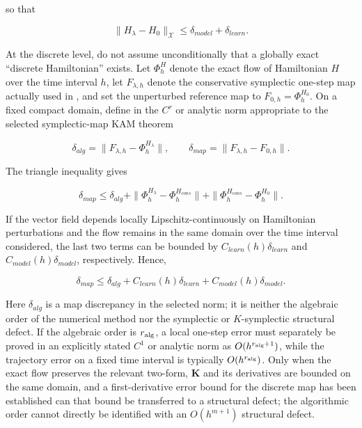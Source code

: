 so that

\begin{equation}
\label{eq:hamiltonian-3-90}
\boxed{\parallel H_{\lambda} - H_{0} \parallel_{\mathcal{X}} \leq \delta_{model} + \delta_{learn}.}
\end{equation}

At the discrete level, do not assume unconditionally that a globally exact ``discrete Hamiltonian'' exists. Let \(\Phi_{h}^{H}\) denote the exact flow of Hamiltonian \(H\) over the time interval \(h\), let \(F_{\lambda,h}\) denote the conservative symplectic one-step map actually used in , and set the unperturbed reference map to \(F_{0,h}=\Phi_{h}^{H_{0}}\). On a fixed compact domain, define in the \(C^{r}\) or analytic norm appropriate to the selected symplectic-map KAM theorem\cite{HairerLubichWanner2006GNI,FengQin2010}

\begin{equation}
\label{eq:hamiltonian-3-91}
\delta_{alg} = \parallel F_{\lambda,h} - \Phi_{h}^{H_{\lambda}} \parallel ,\quad\quad\delta_{map} = \parallel F_{\lambda,h} - F_{0,h} \parallel .
\end{equation}

The triangle inequality gives

\begin{equation}
\label{eq:hamiltonian-3-92}
\boxed{\delta_{map} \leq \delta_{alg} + \parallel \Phi_{h}^{H_{\lambda}} - \Phi_{h}^{H_{cons}} \parallel + \parallel \Phi_{h}^{H_{cons}} - \Phi_{h}^{H_{0}} \parallel .}
\end{equation}

If the vector field depends locally Lipschitz-continuously on Hamiltonian perturbations and the flow remains in the same domain over the time interval considered, the last two terms can be bounded by \(C_{learn}(h)\delta_{learn}\) and \(C_{model}(h)\delta_{model}\), respectively. Hence,

\begin{equation}
\label{eq:hamiltonian-3-93}
\boxed{\delta_{map} \leq \delta_{alg} + C_{learn}(h)\delta_{learn} + C_{model}(h)\delta_{model}.}
\end{equation}

Here \(\delta_{alg}\) is a map discrepancy in the selected norm; it is neither the algebraic order of the numerical method nor the symplectic or \(K\)-symplectic structural defect. If the algebraic order is \(r_{\rm alg}\), a local one-step error must separately be proved in an explicitly stated \(C^{1}\) or analytic norm as \(O(h^{r_{\rm alg}+1})\), while the trajectory error on a fixed time interval is typically \(O(h^{r_{\rm alg}})\). Only when the exact flow preserves the relevant two-form, \(\mathbf{K}\) and its derivatives are bounded on the same domain, and a first-derivative error bound for the discrete map has been established can that bound be transferred to a structural defect; the algorithmic order cannot directly be identified with an \(O(h^{m+1})\) structural defect.

